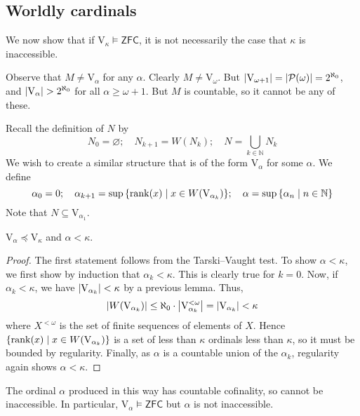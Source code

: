 \subsection{Worldly cardinals}
We now show that if \( \mathrm{V}_\kappa \vDash \mathsf{ZFC} \), it is not necessarily the case that \( \kappa \) is inaccessible.

Observe that \( M \neq \mathrm{V}_\alpha \) for any \( \alpha \).
Clearly \( M \neq \mathrm{V}_\omega \).
But \( \abs{\mathrm{V}_{\omega + 1}} = \abs{\mathcal P(\omega)} = 2^{\aleph_0} \), and \( \abs{\mathrm{V}_\alpha} > 2^{\aleph_0} \) for all \( \alpha \geq \omega + 1 \).
But \( M \) is countable, so it cannot be any of these.

Recall the definition of \( N \) by
\[ N_0 = \varnothing;\quad N_{k+1} = W(N_k);\quad N = \bigcup_{k \in \mathbb N} N_k \]
We wish to create a similar structure that is of the form \( \mathrm{V}_\alpha \) for some \( \alpha \).
We define
\[ \alpha_0 = 0;\quad \alpha_{k+1} = \sup\qty{\rank(x) \mid x \in W(\mathrm{V}_{\alpha_k})};\quad \alpha = \sup\qty{\alpha_n \mid n \in \mathbb N} \]
Note that \( N \subseteq \mathrm{V}_{\alpha_1} \).
\begin{theorem}
    \( \mathrm{V}_\alpha \preceq \mathrm{V}_\kappa \) and \( \alpha < \kappa \).
\end{theorem}
\begin{proof}
    The first statement follows from the Tarski--Vaught test.
    To show \( \alpha < \kappa \), we first show by induction that \( \alpha_k < \kappa \).
    This is clearly true for \( k = 0 \).
    Now, if \( \alpha_k < \kappa \), we have \( \abs{\mathrm{V}_{\alpha_k}} < \kappa \) by a previous lemma.
    Thus,
    \[ \abs{W(\mathrm{V}_{\alpha_k})} \leq \aleph_0 \cdot \abs{\mathrm{V}_{\alpha_k}^{<\omega}} = \abs{\mathrm{V}_{\alpha_k}} < \kappa \]
    where \( X^{<\omega} \) is the set of finite sequences of elements of \( X \).
    Hence \( \qty{\rank(x) \mid x \in W(\mathrm{V}_{\alpha_k})} \) is a set of less than \( \kappa \) ordinals less than \( \kappa \), so it must be bounded by regularity.
    Finally, as \( \alpha \) is a countable union of the \( \alpha_k \), regularity again shows \( \alpha < \kappa \).
\end{proof}
\begin{remark}
    The ordinal \( \alpha \) produced in this way has countable cofinality, so cannot be inaccessible.
    In particular, \( \mathrm{V}_\alpha \vDash \mathsf{ZFC} \) but \( \alpha \) is not inaccessible.
\end{remark}
